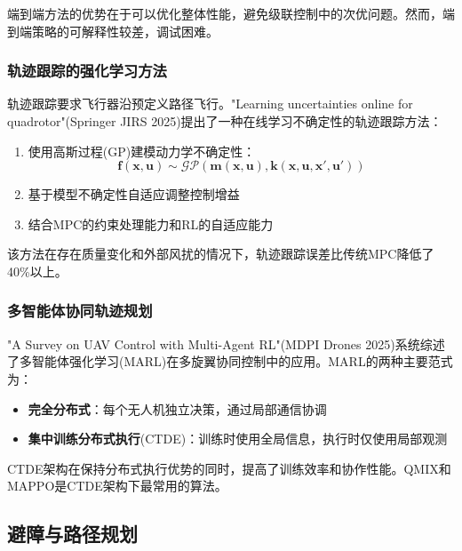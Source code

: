 \documentclass[12pt,a4paper]{ctexart}
\begin{document}
端到端方法的优势在于可以优化整体性能，避免级联控制中的次优问题。然而，端到端策略的可解释性较差，调试困难。

\subsubsection{轨迹跟踪的强化学习方法}

轨迹跟踪要求飞行器沿预定义路径飞行。"Learning uncertainties online for quadrotor"(Springer JIRS 2025)提出了一种在线学习不确定性的轨迹跟踪方法：

\begin{enumerate}
    \item 使用高斯过程(GP)建模动力学不确定性：
    \begin{equation}
        \mathbf{f}(\mathbf{x}, \mathbf{u}) \sim \mathcal{GP}(\mathbf{m}(\mathbf{x}, \mathbf{u}), \mathbf{k}(\mathbf{x}, \mathbf{u}, \mathbf{x}', \mathbf{u}'))
    \end{equation}
    
    \item 基于模型不确定性自适应调整控制增益
    
    \item 结合MPC的约束处理能力和RL的自适应能力
\end{enumerate}

该方法在存在质量变化和外部风扰的情况下，轨迹跟踪误差比传统MPC降低了40\%以上。

\subsubsection{多智能体协同轨迹规划}

"A Survey on UAV Control with Multi-Agent RL"(MDPI Drones 2025)系统综述了多智能体强化学习(MARL)在多旋翼协同控制中的应用。MARL的两种主要范式为：

\begin{itemize}
    \item \textbf{完全分布式}：每个无人机独立决策，通过局部通信协调
    \item \textbf{集中训练分布式执行}(CTDE)：训练时使用全局信息，执行时仅使用局部观测
\end{itemize}

CTDE架构在保持分布式执行优势的同时，提高了训练效率和协作性能。QMIX和MAPPO是CTDE架构下最常用的算法。

\subsection{避障与路径规划}
\end{document}
